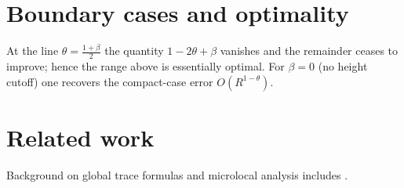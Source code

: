 \documentclass[11pt]{amsart}
\numberwithin{equation}{section}
\theoremstyle{definition}
\theoremstyle{remark}
\begin{document}
\section{Boundary cases and optimality}\label{sec:boundary}
At the line $\theta=\frac{1+\beta}{2}$ the quantity $1-2\theta+\beta$ vanishes and
the remainder ceases to improve; hence the range above is essentially optimal.
For $\beta=0$ (no height cutoff) one recovers the compact-case error $O(R^{1-\theta})$.

\section{Related work}\label{sec:related}
Background on global trace formulas and microlocal analysis includes
\cite{selberg1956, hejhal1976, hejhal1983, mueller1983, buser1992, zworski2012, dyatlovzworski2019, chazarain1974, iwaniec1995, canzanigalkowski2019}.



\end{document}
